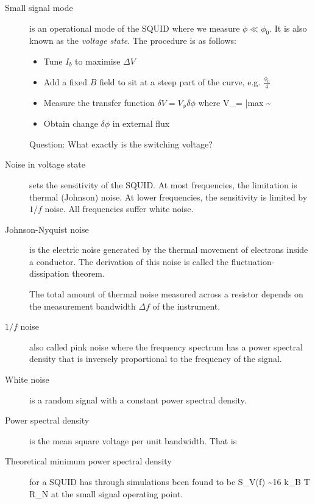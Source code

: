 \begin{description}
\item[Small signal mode] is an operational mode of the SQUID where we measure $\phi \ll \phi_0$. It is also known as the \emph{voltage state}. The procedure is as follows:
\begin{itemize}
\item Tune $I_b$ to maximise $\Delta V$
\item Add a fixed $B$ field to sit at a steep part of the curve, e.g. $\frac{\phi_0}{4}$
\item Measure the transfer function $\delta V = V_\phi \delta \phi$ where
\beq
V_\phi =  \bigg|{max} \sim {}
\eeq
\item Obtain change  $\delta \phi$ in external flux
\end{itemize}



Question: What exactly is the switching voltage? 



\item[Noise in voltage state] sets the sensitivity of the SQUID. At most frequencies, the limitation is thermal (Johnson) noise. At lower frequencies, the sensitivity is limited by $1/f$ noise. All frequencies suffer white noise. 

\item[Johnson-Nyquist noise] is the electric noise generated by the thermal movement of electrons inside a conductor. The derivation of this noise is called the fluctuation-dissipation theorem. 

The total amount of thermal noise measured across a resistor depends on the measurement bandwidth $\Delta f$ of the instrument. 

\item[$1/f$ noise] also called pink noise where the frequency spectrum has a power spectral density that is inversely proportional to the frequency of the signal. 

\item[White noise] is a random signal with a constant power spectral density. 

\item[Power spectral density] is the mean square voltage per unit bandwidth. That is
\beq
{}
\eeq

\item[Theoretical minimum power spectral density] for a SQUID has through simulations been found to be
\beq
S_V(f) \sim 16 k_B T R_N
\eeq
at the small signal operating point. 


\end{description}

